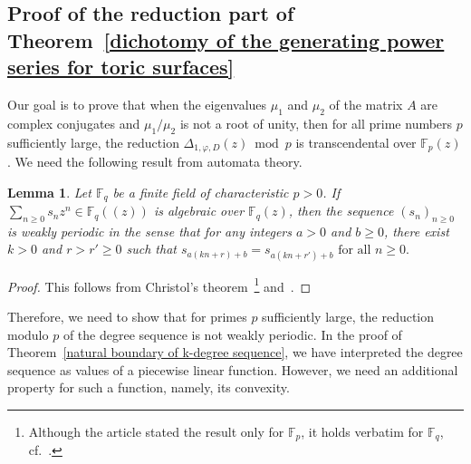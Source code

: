 \documentclass[11pt,a4paper]{article}
\theoremstyle{plain}
\newtheorem{lemma}[theorem]{Lemma}
\theoremstyle{remark}
\theoremstyle{custombold}
\begin{document}
\subsection{Proof of the reduction part of Theorem~\ref{dichotomy of the generating power series for toric surfaces}}
\noindent

Our goal is to prove that when the eigenvalues $\mu_1$ and $\mu_2$ of the matrix $A$ are complex conjugates and $\mu_1/\mu_2$ is not a root of unity, then for all prime numbers $p$ sufficiently large, the reduction $\Delta_{1,\varphi,D}(z)\bmod p$ is transcendental over $\mathbb F_p(z)$. We need the following result from automata theory. 
\begin{lemma}\label{algebraic implies weakly periodic}
     Let $\mathbb F_q$ be a finite field of characteristic $p>0$. If $\sum_{n\geq0}s_nz^n\in \mathbb F_q((z))$ is algebraic over $\mathbb F_q(z)$, then the sequence $(s_n)_{n\geq0}$ is weakly periodic in the sense that for any integers $a>0$ and $b\geq0$, there exist $k>0$ and $r>r'\geq0$ such that
$s_{a(kn+r)+b}=s_{a(kn+r')+b}\text{ for all }n\geq0.$
\end{lemma}
\begin{proof}
   This follows from Christol's theorem~\cite[Th\'eor\`eme~1]{Christol-1979}\footnote{Although the article stated the result only for $\mathbb{F}_p$, it holds verbatim for $\mathbb{F}_q$, cf.~\cite[Th\'eor\`eme~1]{Christol-Kamae-France-Rauzy-1980}.} and~\cite[Lemma~2.1]{Byszewski-Konieczny-2020}.
\end{proof}

Therefore, we need to show that for primes $p$ sufficiently large, the reduction modulo $p$ of the degree sequence is not weakly periodic. In the proof of Theorem~\ref{natural boundary of k-degree sequence}, we have interpreted the degree sequence as values of a piecewise linear function. However, we need an additional property for such a function, namely, its convexity. 
\end{document}
